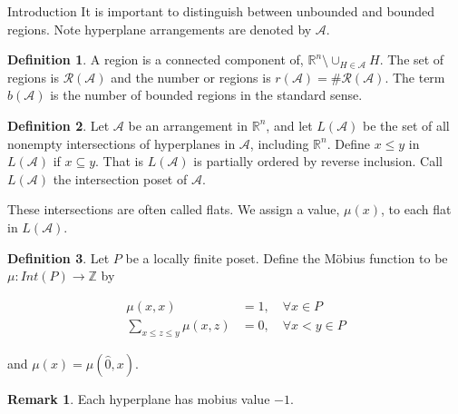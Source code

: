\documentclass[a4paper,12pt]{article}
\theoremstyle{definition}
\newtheorem{definition}{Definition}[section]
\theoremstyle{indented}
\newtheorem*{remark}{Remark}
\begin{document}
\begin{section}{Introduction}
It is important to distinguish between unbounded and bounded regions. Note hyperplane arrangements are denoted by $\mathcal{A}$.

\begin{definition}
A region is a connected component of,
        $\mathbb{R}^n \setminus \cup_{H \in \mathcal{A}} H$. The set of regions is $\mathcal{R}(\mathcal{A})$ and the number or regions is $r(\mathcal{A})=\#\mathcal{R}(\mathcal{A})$. The term $b(\mathcal{A})$ is the number of bounded regions in the standard sense. 

\end{definition}

 \begin{definition}\label{Intposet}
 Let $\mathcal{A}$ be an arrangement in $\mathbb{R}^n$, and let $L(\mathcal{A})$ be the set of all nonempty intersections of hyperplanes in $\mathcal{A}$, including $\mathbb{R}^n$. Define $x \le y $ in $L(\mathcal{A})$ if $x \subseteq y$. That is $L(\mathcal{A})$ is partially ordered by reverse inclusion. Call $L(\mathcal{A})$ the intersection poset of $\mathcal{A}$.
 \end{definition}
 
 These intersections are often called flats. We assign a value, $\mu(x)$, to each flat in $L(\mathcal{A})$.

\begin{definition}\label{mob} Let $P$ be a locally finite poset. Define the Möbius function to be $\mu : Int(P) \rightarrow \mathbb{Z}$ by 

\begin{align*}
    \mu (x,x) &=1, \quad \forall x \in P\\
    \sum _{x \le z\le y} \mu(x,z)&=0, \quad \forall x<y \in P
\end{align*}

and $\mu(x)=\mu(\hat{0},x)$.

\end{definition}

\begin{remark}
  Each hyperplane has mobius value $-1$.
\end{remark}


\end{section}
\end{document}
